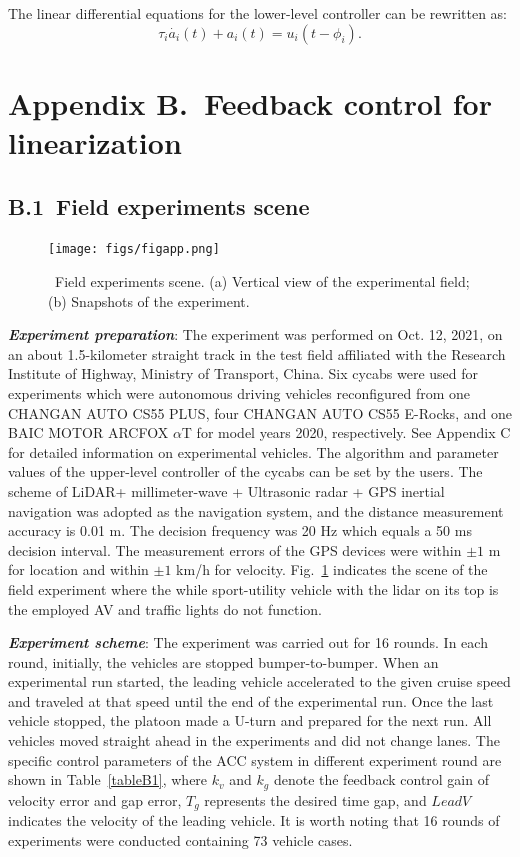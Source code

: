 \documentclass[a4paper]{cas-sc}
\begin{document}
The linear differential equations for the lower-level controller can be rewritten as:
\begin{equation}
  \tau_i\dot{a_i}\left(t\right)+a_i\left(t\right)=u_i(t-\phi_i).
  \label{eqA6}
\end{equation}



\section*{Appendix B.~Feedback control for linearization}
\label{AppendixB}
\subsection*{B.1~Field experiments scene}
\label{Section B.1}

\begin{figure}
  \centering
  \texttt{[image: figs/figapp.png]}
  \caption{~Field experiments scene. (a) Vertical view of the experimental field; (b) Snapshots of the experiment.}
  \label{figB1}
\end{figure}

\textbf{\emph{Experiment preparation}}: The experiment was performed on Oct. 12, 2021, on an about 1.5-kilometer straight track in the test field affiliated with the Research Institute of Highway, Ministry of Transport, China. Six cycabs were used for experiments which were autonomous driving vehicles reconfigured from one CHANGAN AUTO CS55 PLUS, four CHANGAN AUTO CS55 E-Rocks, and one BAIC MOTOR ARCFOX $\alpha$T for model years 2020, respectively. See Appendix C for detailed information on experimental vehicles. The algorithm and parameter values of the upper-level controller of the cycabs can be set by the users. The scheme of LiDAR+ millimeter-wave + Ultrasonic radar + GPS inertial navigation was adopted as the navigation system, and the distance measurement accuracy is 0.01 m. The decision frequency was 20 Hz which equals a 50 ms decision interval. The measurement errors of the GPS devices were within $\pm1$ m for location and within $\pm1$ km/h for velocity. Fig.~\ref{figB1} indicates the scene of the field experiment where the while sport-utility vehicle with the lidar on its top is the employed AV and traffic lights do not function.

\textbf{\emph{Experiment scheme}}: The experiment was carried out for 16 rounds. In each round, initially, the vehicles are stopped bumper-to-bumper. When an experimental run started, the leading vehicle accelerated to the given cruise speed and traveled at that speed until the end of the experimental run. Once the last vehicle stopped, the platoon made a U-turn and prepared for the next run. All vehicles moved straight ahead in the experiments and did not change lanes. The specific control parameters of the ACC system in different experiment round are shown in Table~\ref{tableB1}, where $k_{v}$ and $k_{g}$ denote the feedback control gain of velocity error and gap error, $T_{g}$ represents the desired time gap, and $LeadV$ indicates the velocity of the leading vehicle. It is worth noting that 16 rounds of experiments were conducted containing 73 vehicle cases.
\end{document}
